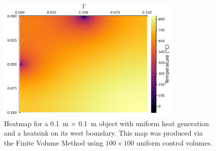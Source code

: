 \begin{figure}
	\centering
	\includegraphics[width=0.8\textwidth]{Chapter_I_Background/Images/T-Heatmap_2_Heatsinks.png}
	\caption[Heatmap Example]{Heatmap for a \SI{0.1}{\meter} $\times$ \SI{0.1}{\meter} object with uniform heat generation and a heatsink on its west boundary. This map was produced via the Finite Volume Method using $100\times 100$ uniform control volumes.}
\end{figure}